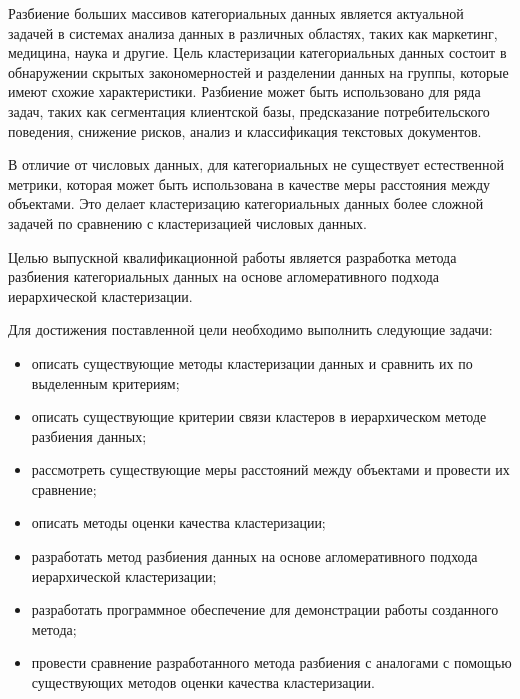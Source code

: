 \maketableofcontents

\intro

Разбиение больших массивов категориальных данных является актуальной задачей в системах анализа данных в различных областях, таких как маркетинг, медицина, наука и другие. Цель кластеризации категориальных данных состоит в обнаружении скрытых закономерностей и разделении данных на группы, которые имеют схожие характеристики. Разбиение может быть использовано для ряда задач, таких как сегментация клиентской базы, предсказание потребительского поведения, снижение рисков, анализ и классификация текстовых документов.

В отличие от числовых данных, для категориальных не существует естественной метрики, которая может быть использована в качестве меры расстояния между объектами. Это делает кластеризацию категориальных данных более сложной задачей по сравнению с кластеризацией числовых данных.

Целью выпускной квалификационной работы является разработка метода разбиения категориальных данных на основе агломеративного подхода иерархической кластеризации.

Для достижения поставленной цели необходимо выполнить следующие задачи:

\begin{itemize}
    \item описать существующие методы кластеризации данных и сравнить их по выделенным критериям;
    \item описать существующие критерии связи кластеров в иерархическом методе разбиения данных;
    \item рассмотреть существующие меры расстояний между объектами и провести их сравнение;
    \item описать методы оценки качества кластеризации;
    \item разработать метод разбиения данных на основе агломеративного подхода иерархической кластеризации;
    \item разработать программное обеспечение для демонстрации работы созданного метода;
    \item провести сравнение разработанного метода разбиения с аналогами с помощью существующих методов оценки качества кластеризации.
\end{itemize}
